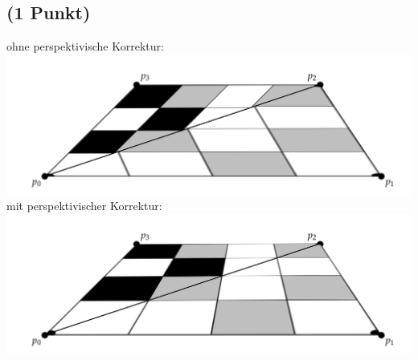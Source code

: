 \documentclass[a4paper,10pt,DIV=14]{article}
\begin{document}
\subsection{(1 Punkt)}

ohne perspektivische Korrektur:\\
\includegraphics[scale = .2]{3d_2}\\

mit perspektivischer Korrektur: \\
\includegraphics[scale= .2]{3d_1}
\end{document}
